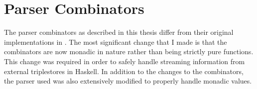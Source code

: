 \documentclass[../main.tex]{subfiles}
\begin{document}
\chapter{Parser Combinators}

The parser combinators as described in this thesis differ from their original implementations
in \cite{frost2014demonstration} \cite{frostagboola2014}.  The most significant change that I made is that the combinators are now monadic in nature rather than being strictly pure functions.  This change was required in order to safely handle streaming information from external triplestores in Haskell. In addition to the changes to the combinators, the parser used \cite{frosthafiz2008} was also extensively modified to properly handle monadic values.
\end{document}

